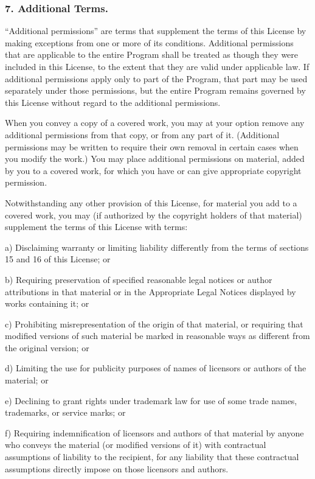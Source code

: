 \subsubsection{7. Additional Terms.}
“Additional permissions” are terms that supplement the terms of this License by making exceptions from one or more of its conditions. Additional permissions that are applicable to the entire Program shall be treated as though they were included in this License, to the extent that they are valid under applicable law. If additional permissions apply only to part of the Program, that part may be used separately under those permissions, but the entire Program remains governed by this License without regard to the additional permissions.\par
When you convey a copy of a covered work, you may at your option remove any additional permissions from that copy, or from any part of it. (Additional permissions may be written to require their own removal in certain cases when you modify the work.) You may place additional permissions on material, added by you to a covered work, for which you have or can give appropriate copyright permission.\par
Notwithstanding any other provision of this License, for material you add to a covered work, you may (if authorized by the copyright holders of that material) supplement the terms of this License with terms:\par
a) Disclaiming warranty or limiting liability differently from the terms of sections 15 and 16 of this License; or\par
b) Requiring preservation of specified reasonable legal notices or author attributions in that material or in the Appropriate Legal Notices displayed by works containing it; or\par
c) Prohibiting misrepresentation of the origin of that material, or requiring that modified versions of such material be marked in reasonable ways as different from the original version; or\par
d) Limiting the use for publicity purposes of names of licensors or authors of the material; or\par
e) Declining to grant rights under trademark law for use of some trade names, trademarks, or service marks; or\par
f) Requiring indemnification of licensors and authors of that material by anyone who conveys the material (or modified versions of it) with contractual assumptions of liability to the recipient, for any liability that these contractual assumptions directly impose on those licensors and authors.\par
